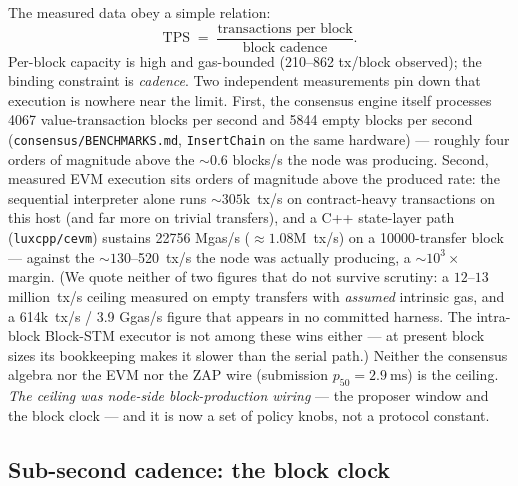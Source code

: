 The measured data obey a simple relation:
\[
  \mathrm{TPS} \;=\; \frac{\text{transactions per block}}{\text{block cadence}}.
\]
Per-block capacity is high and gas-bounded (210--862 tx/block observed);
the binding constraint is \emph{cadence}. Two independent measurements
pin down that execution is nowhere near the limit. First, the consensus
engine itself processes \num{4067} value-transaction blocks per second
and \num{5844} empty blocks per second (\texttt{consensus/BENCHMARKS.md},
\texttt{InsertChain} on the same hardware) --- roughly four orders of
magnitude above the $\sim\!0.6$ blocks/s the node was producing. Second,
measured EVM execution sits orders of magnitude above the produced rate:
the sequential interpreter alone runs $\sim\!\num{305}$k~tx/s on
contract-heavy transactions on this host (and far more on trivial
transfers), and a C++ state-layer path (\texttt{luxcpp/cevm}) sustains
\SI{22756}{} Mgas/s ($\approx\!\num{1.08}$M~tx/s) on a
\num{10000}-transfer block --- against the $\sim\!130$--\SI{520}{}~tx/s the
node was actually producing, a $\sim\!10^3\times$ margin. (We quote neither
of two figures that do not survive scrutiny: a $12$--$13$ million~tx/s
ceiling measured on empty transfers with \emph{assumed} intrinsic gas, and
a \SI{614}{}k~tx/s / \SI{3.9}{} Ggas/s figure that appears in no committed
harness. The intra-block Block-STM executor is not among these wins
either --- at present block sizes its bookkeeping makes it slower than the
serial path.) Neither the
consensus algebra nor the EVM nor the ZAP wire (submission
$p_{50}=\SI{2.9}{\milli\second}$) is the ceiling. \emph{The ceiling was
node-side block-production wiring} --- the proposer window and the block
clock --- and it is now a set of policy knobs, not a protocol constant.

\subsection{Sub-second cadence: the block clock}
\label{ssec:subsec}

